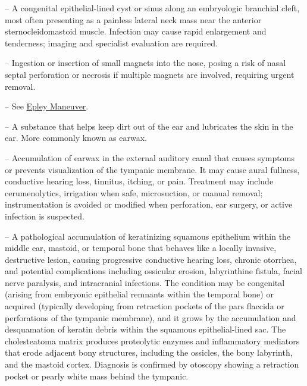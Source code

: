 -- A congenital epithelial-lined cyst or sinus along an embryologic branchial cleft, most often presenting as a painless lateral neck mass near the anterior sternocleidomastoid muscle. Infection may cause rapid enlargement and tenderness; imaging and specialist evaluation are required.

-- Ingestion or insertion of small magnets into the nose, posing a risk of nasal septal perforation or necrosis if multiple magnets are involved, requiring urgent removal.

-- See \hyperlink{Epley Maneuver}{Epley Maneuver}.

-- A substance that helps keep dirt out of the ear and lubricates the skin in the ear. More commonly known as earwax.

-- Accumulation of earwax in the external auditory canal that causes symptoms or prevents visualization of the tympanic membrane. It may cause aural fullness, conductive hearing loss, tinnitus, itching, or pain. Treatment may include cerumenolytics, irrigation when safe, microsuction, or manual removal; instrumentation is avoided or modified when perforation, ear surgery, or active infection is suspected.

-- A pathological accumulation of keratinizing squamous epithelium within the middle ear, mastoid, or temporal bone that behaves like a locally invasive, destructive lesion, causing progressive conductive hearing loss, chronic otorrhea, and potential complications including ossicular erosion, labyrinthine fistula, facial nerve paralysis, and intracranial infections. The condition may be congenital (arising from embryonic epithelial remnants within the temporal bone) or acquired (typically developing from retraction pockets of the pars flaccida or perforations of the tympanic membrane), and it grows by the accumulation and desquamation of keratin debris within the squamous epithelial-lined sac. The cholesteatoma matrix produces proteolytic enzymes and inflammatory mediators that erode adjacent bony structures, including the ossicles, the bony labyrinth, and the mastoid cortex. Diagnosis is confirmed by otoscopy showing a retraction pocket or pearly white mass behind the tympanic.

